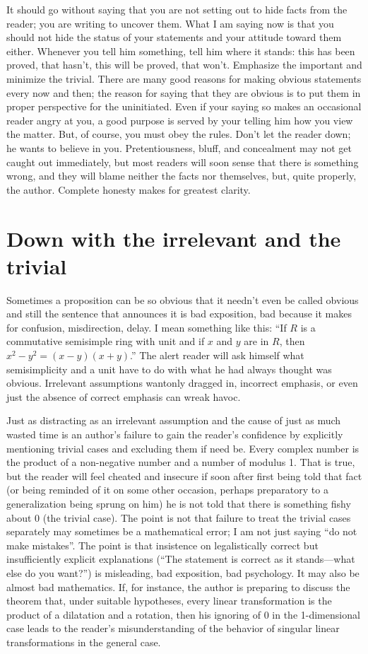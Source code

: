\documentclass[12pt]{article}
\begin{document}
It should go without saying that you are not setting out to hide facts from the reader; you are writing to uncover them. What I am saying now is that you should not hide the status of your statements and your attitude toward them either. Whenever you tell him something, tell him where it stands: this has been proved, that hasn't, this will be proved, that won't. Emphasize the important and minimize the trivial. There are many good reasons for making obvious statements every now and then; the reason for saying that they are obvious is to put them in proper perspective for the uninitiated. Even if your saying so makes an occasional reader angry at you, a good purpose is served by your telling him how you view the matter. But, of course, you must obey the rules. Don't let the reader down; he wants to believe in you. Pretentiousness, bluff, and concealment may not get caught out immediately, but most readers will soon sense that there is something wrong, and they will blame neither the facts nor themselves, but, quite properly, the author. Complete honesty makes for greatest clarity.

\section{Down with the irrelevant and the trivial}

Sometimes a proposition can be so obvious that it needn't even be called obvious and still the sentence that announces it is bad exposition, bad because it makes for confusion, misdirection, delay. I mean something like this: ``If $R$ is a commutative semisimple ring with unit and if $x$ and $y$ are in $R$, then $x^{2}-y^{2}=(x-y)(x+y)$.'' The alert reader will ask himself what semisimplicity and a unit have to do with what he had always thought was obvious. Irrelevant assumptions wantonly dragged in, incorrect emphasis, or even just the absence of correct emphasis can wreak havoc. 

Just as distracting as an irrelevant assumption and the cause of just as much wasted time is an author's failure to gain the reader's confidence by explicitly mentioning trivial cases and excluding them if need be. Every complex number is the product of a non-negative number and a number of modulus 1. That is true, but the reader will feel cheated and insecure if soon after first being told that fact (or being reminded of it on some other occasion, perhaps preparatory to a generalization being sprung on him) he is not told that there is something fishy about 0 (the trivial case). The point is not that failure to treat the trivial cases separately may sometimes be a mathematical error; I am not just saying ``do not make mistakes''. The point is that insistence on legalistically correct but insufficiently explicit explanations (``The statement is correct as it stands---what else do you want?'') is misleading, bad exposition, bad psychology. It may also be almost bad mathematics. If, for instance, the author is preparing to discuss the theorem that, under suitable hypotheses, every linear transformation is the product of a dilatation and a rotation, then his ignoring of 0 in the 1-dimensional case leads to the reader's misunderstanding of the behavior of singular linear transformations in the general case. 
\end{document}
